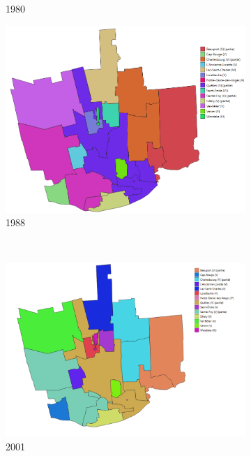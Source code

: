 \begin{figure}[ht]
\begin{subfigure}[t]{0.45\textwidth}
    \caption{1980}
    \label{fig:municipalites_1980}
  \end{subfigure}%
  \begin{subfigure}[t]{0.45\textwidth}
    \centering
    \includegraphics[width=0.9\linewidth]{images/municipalites_1988.png}
    \caption{1988}
    \label{fig:municipalites_1988}
  \end{subfigure}\\
  \begin{subfigure}[t]{0.45\textwidth}
    \centering
    \includegraphics[width=0.9\linewidth]{images/municipalites_2001.png}
    \caption{2001}
    \label{fig:municipalites_2001}
  \end{subfigure}%
  \begin{subfigure}[t]{0.45\textwidth}
    \centering

\end{subfigure}
\end{figure}
